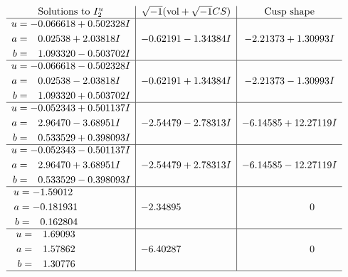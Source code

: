 \documentclass[1p]{elsarticle_modified}
\theoremstyle{definition}
\newcommand{\I}{\sqrt{-1}}
\begin{document}
$$\begin{array}{c|c|c}
\text{Solutions to }I^u_{2}& \I (\text{vol} + \sqrt{-1}CS) & \text{Cusp shape}\\
 \hline 
\begin{aligned}
u &= -0.066618 + 0.502328 I \\
a &= \phantom{-}0.02538 + 2.03818 I \\
b &= \phantom{-}1.093320 - 0.503702 I\end{aligned}
 & -0.62191 - 1.34384 I & -2.21373 + 1.30993 I \\ \hline\begin{aligned}
u &= -0.066618 - 0.502328 I \\
a &= \phantom{-}0.02538 - 2.03818 I \\
b &= \phantom{-}1.093320 + 0.503702 I\end{aligned}
 & -0.62191 + 1.34384 I & -2.21373 - 1.30993 I \\ \hline\begin{aligned}
u &= -0.052343 + 0.501137 I \\
a &= \phantom{-}2.96470 - 3.68951 I \\
b &= \phantom{-}0.533529 + 0.398093 I\end{aligned}
 & -2.54479 - 2.78313 I & -6.14585 + 12.27119 I \\ \hline\begin{aligned}
u &= -0.052343 - 0.501137 I \\
a &= \phantom{-}2.96470 + 3.68951 I \\
b &= \phantom{-}0.533529 - 0.398093 I\end{aligned}
 & -2.54479 + 2.78313 I & -6.14585 - 12.27119 I \\ \hline\begin{aligned}
u &= -1.59012\phantom{ +0.000000I} \\
a &= -0.181931\phantom{ +0.000000I} \\
b &= \phantom{-}0.162804\phantom{ +0.000000I}\end{aligned}
 & -2.34895\phantom{ +0.000000I} & \phantom{-0.000000 } 0 \\ \hline\begin{aligned}
u &= \phantom{-}1.69093\phantom{ +0.000000I} \\
a &= \phantom{-}1.57862\phantom{ +0.000000I} \\
b &= \phantom{-}1.30776\phantom{ +0.000000I}\end{aligned}
 & -6.40287\phantom{ +0.000000I} & \phantom{-0.000000 } 0\\
 \hline 
 \end{array}$$\newpage
\end{document}
